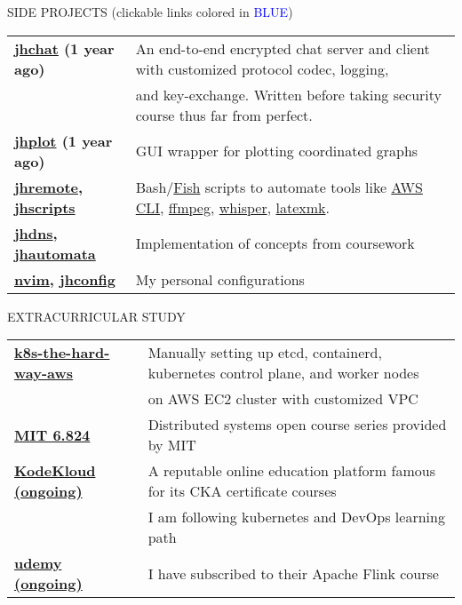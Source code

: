 \documentclass{resume} %
\begin{document}
\begin{rSection}{SIDE PROJECTS (clickable links colored in \textcolor{blue}{BLUE})}

\begin{tabular}{ @{} >{\bfseries}l @{\hspace{6ex}} l }
\href{https://github.com/realzhujunhao/jhchat}{jhchat}
(1 year ago) & An end-to-end encrypted chat server and client with
                      customized protocol codec, logging, \\ 
                    & and key-exchange. Written before taking security course thus far from perfect. \\
\href{https://github.com/realzhujunhao/jhplot}{jhplot}
(1 year ago) & GUI wrapper for plotting coordinated graphs \\
\href{https://github.com/realzhujunhao/jhremote}{jhremote},
\href{https://github.com/realzhujunhao/jhscripts}{jhscripts}
& Bash/\href{https://fishshell.com/}{Fish} scripts to automate tools like
\href{https://aws.amazon.com/cli/}{AWS CLI},
\href{https://github.com/FFmpeg/FFmpeg}{ffmpeg}, 
\href{https://github.com/openai/whisper}{whisper}, 
\href{https://mg.readthedocs.io/latexmk.html}{latexmk}. \\
\href{https://github.com/realzhujunhao/jhdns}{jhdns},
\href{https://github.com/realzhujunhao/jhautomata}{jhautomata}
& Implementation of concepts from coursework \\
\href{https://github.com/realzhujunhao/nvim}{nvim},
\href{https://github.com/realzhujunhao/jhconfig}{jhconfig}
& My personal configurations \\
\end{tabular}

\end{rSection} 

\begin{rSection}{EXTRACURRICULAR STUDY}
\begin{tabular}{ @{} >{\bfseries}l @{\hspace{6ex}} l }
\href{https://github.com/realzhujunhao/kubernetes-the-hard-way-aws}{k8s-the-hard-way-aws}
& Manually setting up etcd, containerd, kubernetes control plane, and worker nodes \\ 
& on AWS EC2 cluster with customized VPC \\
\href{https://www.youtube.com/watch?v=cQP8WApzIQQ&list=PLrw6a1wE39_tb2fErI4-WkMbsvGQk9_UB}{MIT 6.824}
& Distributed systems open course series provided by MIT \\
\href{https://kodekloud.com/}{KodeKloud (ongoing)}
& A reputable online education platform famous for its CKA certificate courses \\
& I am following kubernetes and DevOps learning path \\
\href{https://www.udemy.com/course/apache-flink-a-real-time-hands-on-course-on-flink}{udemy (ongoing)}
& I have subscribed to their Apache Flink course \\
\end{tabular}
\end{rSection}
\end{document}
